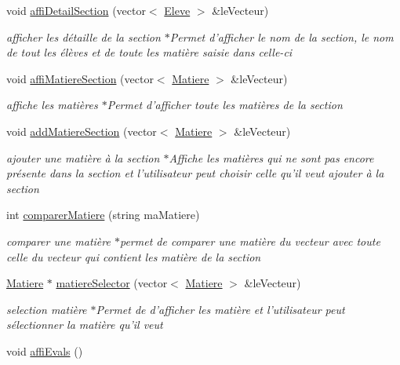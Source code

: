 \begin{DoxyCompactItemize}
void \hyperlink{class_section_a6279989607a517310651263aff2d42dd}{affi\-Detail\-Section} (vector$<$ \hyperlink{class_eleve}{Eleve} $>$ \&le\-Vecteur)
\begin{DoxyCompactList}\small\item\em afficher les détaille de la section $\ast$\-Permet d'afficher le nom de la section, le nom de tout les élèves et de toute les matière saisie dans celle-\/ci \end{DoxyCompactList}\item 
void \hyperlink{class_section_a0758af47447fe1099202b67e817c6cdb}{affi\-Matiere\-Section} (vector$<$ \hyperlink{class_matiere}{Matiere} $>$ \&le\-Vecteur)
\begin{DoxyCompactList}\small\item\em affiche les matières $\ast$\-Permet d'afficher toute les matières de la section \end{DoxyCompactList}\item 
void \hyperlink{class_section_a481421eaade6bf5935654a2386860eea}{add\-Matiere\-Section} (vector$<$ \hyperlink{class_matiere}{Matiere} $>$ \&le\-Vecteur)
\begin{DoxyCompactList}\small\item\em ajouter une matière à la section $\ast$\-Affiche les matières qui ne sont pas encore présente dans la section et l'utilisateur peut choisir celle qu'il veut ajouter à la section \end{DoxyCompactList}\item 
int \hyperlink{class_section_a6ab96944b37bfc813c3bac3c734951e9}{comparer\-Matiere} (string ma\-Matiere)
\begin{DoxyCompactList}\small\item\em comparer une matière $\ast$permet de comparer une matière du vecteur avec toute celle du vecteur qui contient les matière de la section \end{DoxyCompactList}\item 
\hyperlink{class_matiere}{Matiere} $\ast$ \hyperlink{class_section_a92511a0a21b91748cc244a2d220f76a5}{matiere\-Selector} (vector$<$ \hyperlink{class_matiere}{Matiere} $>$ \&le\-Vecteur)
\begin{DoxyCompactList}\small\item\em selection matière $\ast$\-Permet de d'afficher les matière et l'utilisateur peut sélectionner la matière qu'il veut \end{DoxyCompactList}\item 
void \hyperlink{class_section_a1b8aa93fa07ecafd30547ca0285738ae}{affi\-Evals} ()

\end{DoxyCompactItemize}
